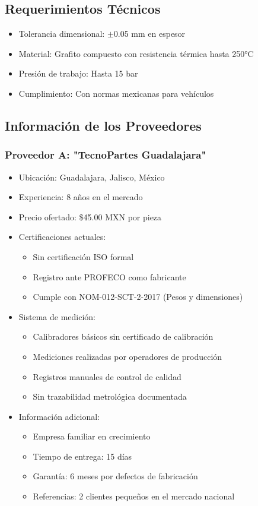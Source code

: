 \documentclass{article}
\begin{document}
\subsection*{Requerimientos Técnicos}
\begin{itemize}
    \item Tolerancia dimensional: $\pm$0.05 mm en espesor
    \item Material: Grafito compuesto con resistencia térmica hasta 250°C
    \item Presión de trabajo: Hasta 15 bar
    \item Cumplimiento: Con normas mexicanas para vehículos
\end{itemize}

\subsection*{Información de los Proveedores}

\subsubsection*{Proveedor A: "TecnoPartes Guadalajara"}
\begin{itemize}
    \item Ubicación: Guadalajara, Jalisco, México
    \item Experiencia: 8 años en el mercado
    \item Precio ofertado: \$45.00 MXN por pieza
    \item Certificaciones actuales:
    \begin{itemize}
        \item Sin certificación ISO formal
        \item Registro ante PROFECO como fabricante
        \item Cumple con NOM-012-SCT-2-2017 (Pesos y dimensiones)
    \end{itemize}
    \item Sistema de medición:
    \begin{itemize}
        \item Calibradores básicos sin certificado de calibración
        \item Mediciones realizadas por operadores de producción
        \item Registros manuales de control de calidad
        \item Sin trazabilidad metrológica documentada
    \end{itemize}
    \item Información adicional:
    \begin{itemize}
        \item Empresa familiar en crecimiento
        \item Tiempo de entrega: 15 días
        \item Garantía: 6 meses por defectos de fabricación
        \item Referencias: 2 clientes pequeños en el mercado nacional
    \end{itemize}
\end{itemize}
\end{document}
